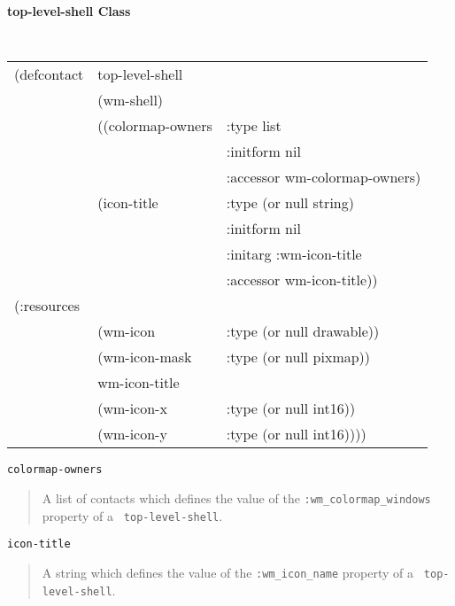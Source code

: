 \documentclass[twoside]{book}
\begin{document}
\begin{sloppy}
{\samepage 
{\large {\bf top-level-shell \hfill Class}} 
\begin{flushright} \parbox[t]{6.125in}{
\tt
\begin{tabular}{lll}
\raggedright
(defcontact & top-level-shell \\
&  (wm-shell) \\
&  ((colormap-owners   & :type     list \\
&		       & :initform nil  \\
&		       & :accessor wm-colormap-owners)    \\
&   (icon-title        & :type     (or null string) \\
&		       & :initform nil  \\
&		       & :initarg  :wm-icon-title \\
&		       & :accessor wm-icon-title))    \\
(:resources\\
&    (wm-icon        &:type (or null drawable))            \\
&    (wm-icon-mask   &:type (or null pixmap))                 \\
&     wm-icon-title \\
&    (wm-icon-x      &:type (or null int16))              \\
&    (wm-icon-y      &:type (or null int16))))
\end{tabular}
\rm

}\end{flushright}}

\begin{flushright} \parbox[t]{6.125in}{
{\tt colormap-owners}
\begin{quote}
A list of contacts which defines the value of the
{\tt :wm\_colormap\_windows} property of a {\tt
top-level-shell}. 
\end{quote}

}\end{flushright}

\begin{flushright} \parbox[t]{6.125in}{
{\tt icon-title}
\begin{quote}
A string which defines the value of the
{\tt :wm\_icon\_name} property of a {\tt
top-level-shell}. 
\end{quote}

}
\end{flushright}
\end{sloppy}
\end{document}
